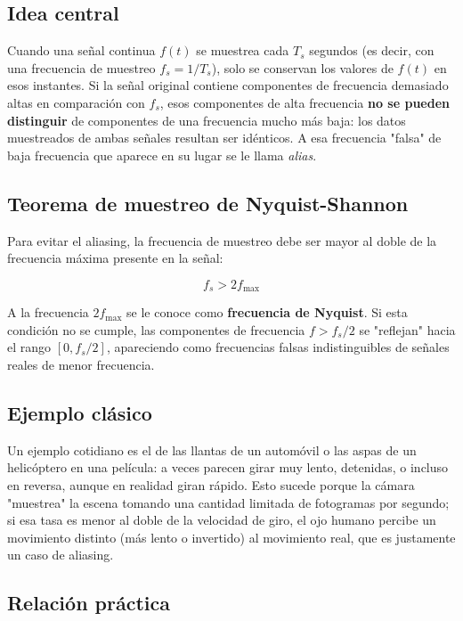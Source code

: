 \documentclass[11pt]{article}
\begin{document}
\subsection{Idea central}

Cuando una señal continua $f(t)$ se muestrea cada $T_s$ segundos
(es decir, con una frecuencia de muestreo $f_s = 1/T_s$), solo se
conservan los valores de $f(t)$ en esos instantes. Si la señal
original contiene componentes de frecuencia demasiado altas en
comparación con $f_s$, esos componentes de alta frecuencia
\textbf{no se pueden distinguir} de componentes de una frecuencia
mucho más baja: los datos muestreados de ambas señales resultan
ser idénticos. A esa frecuencia "falsa" de baja frecuencia que
aparece en su lugar se le llama \emph{alias}.

\subsection{Teorema de muestreo de Nyquist-Shannon}

Para evitar el aliasing, la frecuencia de muestreo debe ser mayor
al doble de la frecuencia máxima presente en la señal:

\begin{equation}
\boxed{\; f_s > 2 f_{\max} \;}
\end{equation}

A la frecuencia $2f_{\max}$ se le conoce como \textbf{frecuencia de
Nyquist}. Si esta condición no se cumple, las componentes de
frecuencia $f > f_s/2$ se "reflejan" hacia el rango
$[0, f_s/2]$, apareciendo como frecuencias falsas indistinguibles
de señales reales de menor frecuencia.

\subsection{Ejemplo clásico}

Un ejemplo cotidiano es el de las llantas de un automóvil o las
aspas de un helicóptero en una película: a veces parecen girar
muy lento, detenidas, o incluso en reversa, aunque en realidad
giran rápido. Esto sucede porque la cámara "muestrea" la escena
tomando una cantidad limitada de fotogramas por segundo; si esa
tasa es menor al doble de la velocidad de giro, el ojo humano
percibe un movimiento distinto (más lento o invertido) al
movimiento real, que es justamente un caso de aliasing.

\subsection{Relación práctica}
\end{document}
